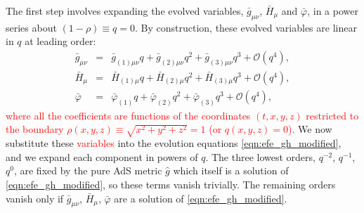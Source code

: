 \documentclass[a4paper,11pt]{article}
\numberwithin{equation}{section}
\begin{document}
The first step involves expanding the evolved variables, $\bar{g}_{\mu \nu}$, $\bar{H}_{\mu}$ and $\bar{\varphi}$, in a power series about $(1-\rho) \equiv q = 0$. 
By construction, these evolved variables are linear in $q$ at leading order:
\begin{eqnarray}\label{eqn:qexp}
\bar{g}_{\mu \nu} &=& \bar{g}_{(1) \mu \nu} q + \bar{g}_{(2) \mu \nu} q^2 + \bar{g}_{(3) \mu \nu} q^3 + \mathcal{O}(q^4), \label{eqn:qexpg} \\
\bar{H}_{\mu} &=& \bar{H}_{(1) \mu} q + \bar{H}_{(2) \mu} q^2 + \bar{H}_{(3) \mu} q^3 + \mathcal{O}(q^4)  ,\label{eqn:qexpH}\\
\bar{\varphi} &=& \bar{\varphi}_{(1)} q + \bar{\varphi}_{(2)} q^2 + \bar{\varphi}_{(3)} q^3 + \mathcal{O}(q^4), \label{eqn:qexpphi}
\end{eqnarray}
\textcolor{red}{where all the coefficients are functions of the coordinates $(t,x,y,z)$ restricted to the boundary $\rho(x,y,z)\equiv\sqrt{x^2+y^2+z^2}=1$ (or $q(x,y,z)=0$).}
We now substitute these \textcolor{red}{variables} into the evolution equations \eqref{eqn:efe_gh_modified}, and we expand each component in powers of $q$. The three lowest orders, $q^{-2}$, $q^{-1}$, $q^0$, are fixed by the pure AdS metric $\hat{g}$ which itself is a solution of \eqref{eqn:efe_gh_modified}, so these terms vanish trivially. The remaining orders vanish only if $\bar{g}_{\mu \nu}$, $\bar{H}_{\mu}$, $\bar{\varphi}$ are a solution of \eqref{eqn:efe_gh_modified}.
\end{document}
